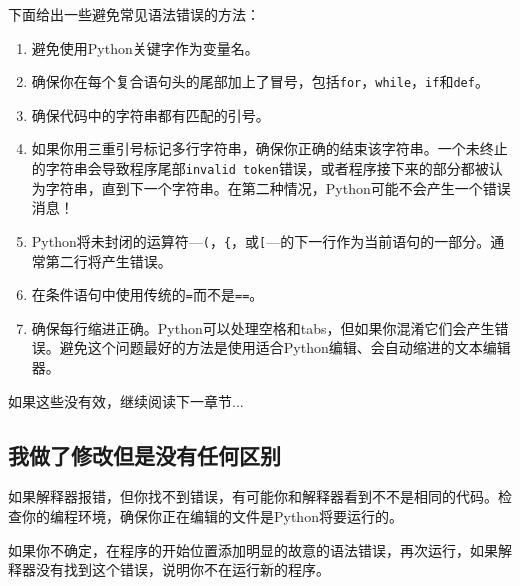 下面给出一些避免常见语法错误的方法：


\begin{enumerate}

\item 避免使用Python关键字作为变量名。


\item 确保你在每个复合语句头的尾部加上了冒号，包括{\tt for}，{\tt while}，{\tt if}和{\tt def}。


\item 确保代码中的字符串都有匹配的引号。


\item 如果你用三重引号标记多行字符串，确保你正确的结束该字符串。一个未终止的字符串会导致程序尾部{\tt invalid token}错误，或者程序接下来的部分都被认为字符串，直到下一个字符串。在第二种情况，Python可能不会产生一个错误消息！


\item Python将未封闭的运算符---\verb+(+，\verb+{+，或\verb+[+---的下一行作为当前语句的一部分。通常第二行将产生错误。

\item 在条件语句中使用传统的{\tt =}而不是{\tt ==}。


\item 确保每行缩进正确。Python可以处理空格和tabs，但如果你混淆它们会产生错误。避免这个问题最好的方法是使用适合Python编辑、会自动缩进的文本编辑器。


\end{enumerate}

如果这些没有效，继续阅读下一章节...


\subsection{我做了修改但是没有任何区别}

如果解释器报错，但你找不到错误，有可能你和解释器看到不不是相同的代码。检查你的编程环境，确保你正在编辑的文件是Python将要运行的。

如果你不确定，在程序的开始位置添加明显的故意的语法错误，再次运行，如果解释器没有找到这个错误，说明你不在运行新的程序。

